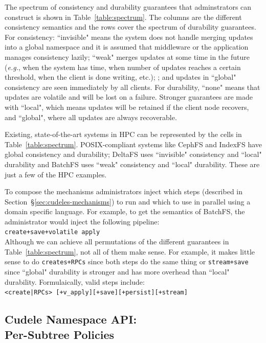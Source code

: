 The spectrum of consistency and durability guarantees that adminstrators can
construct is shown in Table~\ref{table:spectrum}. The columns are the different
consistency semantics and the rows cover the spectrum of durability guarantees.
For consistency: ``invisible" means the system does not handle merging updates
into a global namespace and it is assumed that middleware or the application
manages consistency lazily; ``weak" merges updates at some time in the
future ({\it e.g.}, when the system has time, when number of updates reaches a
certain threshold, when the client is done writing, etc.); ; and updates in
``global" consistency are seen immediately by all clients. For durability,
``none" means that updates are volatile and will be lost on a failure. Stronger
guarantees are made with ``local", which means updates will be retained if the
client node recovers, and ``global", where all updates are always recoverable.

Existing, state-of-the-art systems in HPC can be represented by the cells in
Table~\ref{table:spectrum}.  POSIX-compliant systems like CephFS and IndexFS
have global consistency and durability; DeltaFS uses ``invisible" consistency
and ``local" durability and BatchFS uses ``weak" consistency and ``local"
durability. These are just a few of the HPC examples.  

To compose the mechanisms administrators inject which steps (described in
Section~\S\ref{sec:cudeles-mechanisms}) to run and which to use in parallel
using a domain specific language. For example, to get the semantics of BatchFS,
the administrator would inject the following pipeline:\\

\noindent \texttt{create+save+volatile apply}\\

Although we can achieve all permutations of the different guarantees in
Table~\ref{table:spectrum}, not all of them make sense. For example, it
makes little sense to do \texttt{creates+RPCs} since both steps do the same
thing or \texttt{stream+save} since ``global" durability is stronger and has
more overhead than ``local" durability.  Formulaically, valid steps
include:\\

\noindent \texttt{<create|RPCs> [+v\_apply][+save][+persist][+stream]}

\subsection{Cudele Namespace API:\\Per-Subtree Policies}
\label{sec:cudele-namespace-api-per-subtree-policies}

